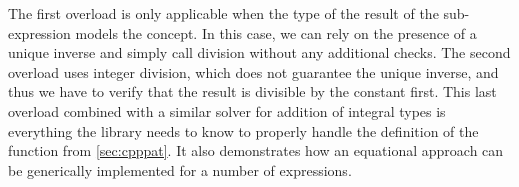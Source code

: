 \noindent
The first overload is only applicable when the type of the result of the 
sub-expression models the  concept. In this case, we can rely on the 
presence of a unique inverse and simply call division without any additional 
checks. The second overload uses integer division, which does not guarantee the 
unique inverse, and thus we have to verify that the result is divisible by the 
constant first. This last overload combined with a similar solver for addition 
of integral types is everything the library needs to know to properly handle the 
definition of the  function from \textsection\ref{sec:cpppat}. It also 
demonstrates how an equational approach can be generically implemented for a 
number of expressions.

%
%


